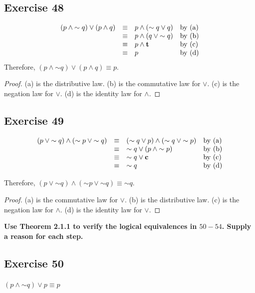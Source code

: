 \documentclass[14pt]{extarticle}
\newcommand{\true}{{\bf t}}
\newcommand{\false}{{\bf c}}
\begin{document}
\subsection{Exercise 48}
$$
\begin{array}{rcll}
(p \wedge {\sim q}) \vee (p \wedge q) & \equiv & p \wedge ({\sim q} \vee q) & \text{by (a)} \\
& \equiv & p \wedge (q \vee {\sim q}) & \text{by (b)} \\
& \equiv & p \wedge \true & \text{by (c)} \\
& \equiv & p & \text{by (d)} \\
\end{array}
$$
Therefore, $(p \wedge {\sim q}) \vee (p \wedge q) \equiv p$.

\begin{proof}
(a) is the distributive law. (b) is the commutative law for
$\vee$. (c) is the negation law for $\vee$. (d) is the identity law for $\wedge$.
\end{proof}

\subsection{Exercise 49}
$$
\begin{array}{rcll}
(p \vee {\sim q}) \wedge ({\sim p} \vee {\sim q}) & \equiv & ({\sim q} \vee p) \wedge ({\sim q} \vee {\sim p}) & \text{by (a)} \\
& \equiv & {\sim q} \vee (p \wedge {\sim p}) & \text{by (b)} \\
& \equiv & {\sim q} \vee \false & \text{by (c)} \\
& \equiv & {\sim q} & \text{by (d)} \\
\end{array}
$$

Therefore, $(p \vee {\sim q}) \wedge ({\sim p} \vee {\sim q}) \equiv {\sim q}$.

\begin{proof}
(a) is the commutative law for $\vee$. (b) is the distributive
law. (c) is the negation law for $\wedge$. (d) is the identity law for $\vee$.
\end{proof}

{\bf Use Theorem 2.1.1 to verify the logical equivalences in $50-54$. Supply a reason for each step.}

\subsection{Exercise 50}
$(p \wedge {\sim q}) \vee p \equiv p$
\end{document}
